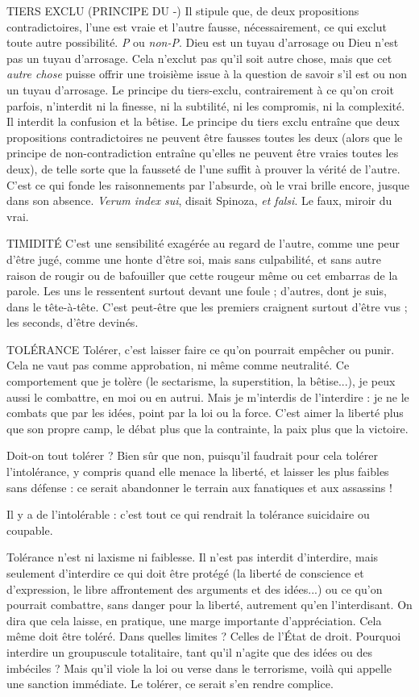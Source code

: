 TIERS EXCLU (PRINCIPE DU -) Il stipule que, de deux propositions contradictoires,
l’une est vraie et l’autre fausse,
nécessairement, ce qui exclut toute autre possibilité. {\it P} ou {\it non-P}. Dieu est un
tuyau d’arrosage ou Dieu n’est pas un tuyau d’arrosage. Cela n’exclut pas qu’il
soit autre chose, mais que cet {\it autre chose} puisse offrir une troisième issue à la
question de savoir s’il est ou non un tuyau d’arrosage. Le principe du tiers-exclu,
contrairement à ce qu’on croit parfois, n’interdit ni la finesse, ni la subtilité,
ni les compromis, ni la complexité. Il interdit la confusion et la bêtise.
Le principe du tiers exclu entraîne que deux propositions contradictoires ne
peuvent être fausses toutes les deux (alors que le principe de non-contradiction
entraîne qu'elles ne peuvent être vraies toutes les deux), de telle sorte que la
fausseté de l’une suffit à prouver la vérité de l’autre. C’est ce qui fonde les raisonnements
par l'absurde, où le vrai brille encore, jusque dans son absence.
{\it Verum index sui}, disait Spinoza, {\it et falsi}. Le faux, miroir du vrai.

TIMIDITÉ C’est une sensibilité exagérée au regard de l’autre, comme une
peur d’être jugé, comme une honte d’être soi, mais sans culpabilité,
et sans autre raison de rougir ou de bafouiller que cette rougeur même ou
cet embarras de la parole. Les uns le ressentent surtout devant une foule ;
d’autres, dont je suis, dans le tête-à-tête. C’est peut-être que les premiers craignent
surtout d’être vus ; les seconds, d’être devinés.

TOLÉRANCE Tolérer, c’est laisser faire ce qu’on pourrait empêcher ou
punir. Cela ne vaut pas comme approbation, ni même
comme neutralité. Ce comportement que je tolère (le sectarisme, la superstition,
la bêtise...), je peux aussi le combattre, en moi ou en autrui. Mais je
m'interdis de l’interdire : je ne le combats que par les idées, point par la loi ou
la force. C’est aimer la liberté plus que son propre camp, le débat plus que la
contrainte, la paix plus que la victoire.

Doit-on tout tolérer ? Bien sûr que non, puisqu'il faudrait pour cela tolérer
l'intolérance, y compris quand elle menace la liberté, et laisser les plus faibles
sans défense : ce serait abandonner le terrain aux fanatiques et aux assassins !

Il y a de l’intolérable : c’est tout ce qui rendrait la tolérance suicidaire ou
coupable.

Tolérance n’est ni laxisme ni faiblesse. Il n’est pas interdit d’interdire, mais
seulement d'interdire ce qui doit être protégé (la liberté de conscience et
d'expression, le libre affrontement des arguments et des idées...) ou ce qu'on
pourrait combattre, sans danger pour la liberté, autrement qu’en l’interdisant.
On dira que cela laisse, en pratique, une marge importante d’appréciation. Cela
même doit être toléré. Dans quelles limites ? Celles de l’État de droit. Pourquoi
interdire un groupuscule totalitaire, tant qu’il n’agite que des idées ou des
imbéciles ? Mais qu’il viole la loi ou verse dans le terrorisme, voilà qui appelle
une sanction immédiate. Le tolérer, ce serait s’en rendre complice.

